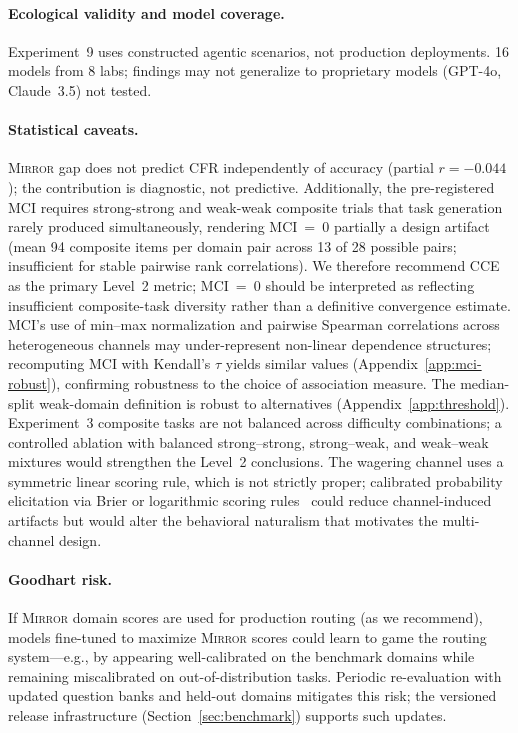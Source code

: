 \documentclass[10pt]{article}
\newcommand{\mirror}{\textsc{Mirror}}
\newcommand{\MCI}{MCI}
\newcommand{\CCE}{CCE}
\newcommand{\CFR}{CFR}
\begin{document}
\paragraph{Ecological validity and model coverage.}
Experiment~9 uses constructed agentic scenarios, not production deployments. 16 models from 8 labs; findings may not generalize to proprietary models (GPT-4o, Claude~3.5) not tested.

\paragraph{Statistical caveats.}
\mirror{} gap does not predict \CFR{} independently of accuracy (partial $r = -0.044$); the contribution is diagnostic, not predictive. Additionally, the pre-registered \MCI{} requires strong-strong and weak-weak composite trials that task generation rarely produced simultaneously, rendering \MCI{}~=~0 partially a design artifact (mean 94 composite items per domain pair across 13 of 28 possible pairs; insufficient for stable pairwise rank correlations). We therefore recommend \CCE{} as the primary Level~2 metric; \MCI{}~=~0 should be interpreted as reflecting insufficient composite-task diversity rather than a definitive convergence estimate.
MCI's use of min--max normalization and pairwise Spearman correlations across
heterogeneous channels may under-represent non-linear dependence structures;
recomputing MCI with Kendall's $\tau$ yields similar values (Appendix~\ref{app:mci-robust}), confirming robustness to the choice of association measure.
The median-split weak-domain definition is robust to alternatives (Appendix~\ref{app:threshold}).
Experiment~3 composite tasks are not balanced across difficulty combinations;
a controlled ablation with balanced strong--strong, strong--weak, and weak--weak
mixtures would strengthen the Level~2 conclusions.
The wagering channel uses a symmetric linear scoring rule, which is not strictly
proper; calibrated probability elicitation via Brier or logarithmic scoring
rules~\citep{gneiting2007strictly} could reduce channel-induced artifacts but
would alter the behavioral naturalism that motivates the multi-channel design.

\paragraph{Goodhart risk.} If \mirror{} domain scores are used for production routing (as we recommend), models fine-tuned to maximize \mirror{} scores could learn to game the routing system---e.g., by appearing well-calibrated on the benchmark domains while remaining miscalibrated on out-of-distribution tasks. Periodic re-evaluation with updated question banks and held-out domains mitigates this risk; the versioned release infrastructure (Section~\ref{sec:benchmark}) supports such updates.
\end{document}
